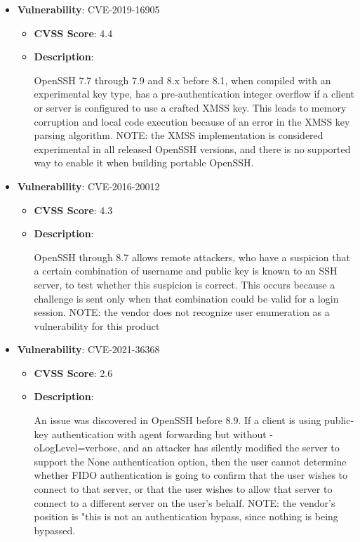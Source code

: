 \documentclass{article}
\begin{document}
\begin{itemize}
    
        \item \textbf{Vulnerability}: CVE-2019-16905
        \begin{itemize}
            \item \textbf{CVSS Score}:  4.4 
            \item \textbf{Description}:
            \parbox[t]{0.9\linewidth}{
                \ttfamily OpenSSH 7.7 through 7.9 and 8.x before 8.1, when compiled with an experimental key type, has a pre-authentication integer overflow if a client or server is configured to use a crafted XMSS key. This leads to memory corruption and local code execution because of an error in the XMSS key parsing algorithm. NOTE: the XMSS implementation is considered experimental in all released OpenSSH versions, and there is no supported way to enable it when building portable OpenSSH.
            }
        \end{itemize}
    
        \item \textbf{Vulnerability}: CVE-2016-20012
        \begin{itemize}
            \item \textbf{CVSS Score}:  4.3 
            \item \textbf{Description}:
            \parbox[t]{0.9\linewidth}{
                \ttfamily OpenSSH through 8.7 allows remote attackers, who have a suspicion that a certain combination of username and public key is known to an SSH server, to test whether this suspicion is correct. This occurs because a challenge is sent only when that combination could be valid for a login session. NOTE: the vendor does not recognize user enumeration as a vulnerability for this product
            }
        \end{itemize}
    
        \item \textbf{Vulnerability}: CVE-2021-36368
        \begin{itemize}
            \item \textbf{CVSS Score}:  2.6 
            \item \textbf{Description}:
            \parbox[t]{0.9\linewidth}{
                \ttfamily An issue was discovered in OpenSSH before 8.9. If a client is using public-key authentication with agent forwarding but without -oLogLevel=verbose, and an attacker has silently modified the server to support the None authentication option, then the user cannot determine whether FIDO authentication is going to confirm that the user wishes to connect to that server, or that the user wishes to allow that server to connect to a different server on the user's behalf. NOTE: the vendor's position is "this is not an authentication bypass, since nothing is being bypassed.
            }
        \end{itemize}
    

\end{itemize}
\end{document}
